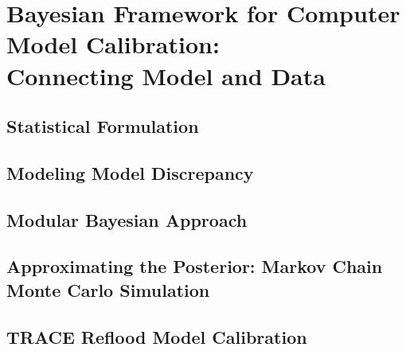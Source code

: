 \chapter{Bayesian Framework for Computer Model Calibration:\\
Connecting Model and Data}

\section{Statistical Formulation}

\section{Modeling Model Discrepancy}

\section{Modular Bayesian Approach}

\section{Approximating the Posterior: Markov Chain Monte Carlo Simulation}

\section{TRACE Reflood Model Calibration}